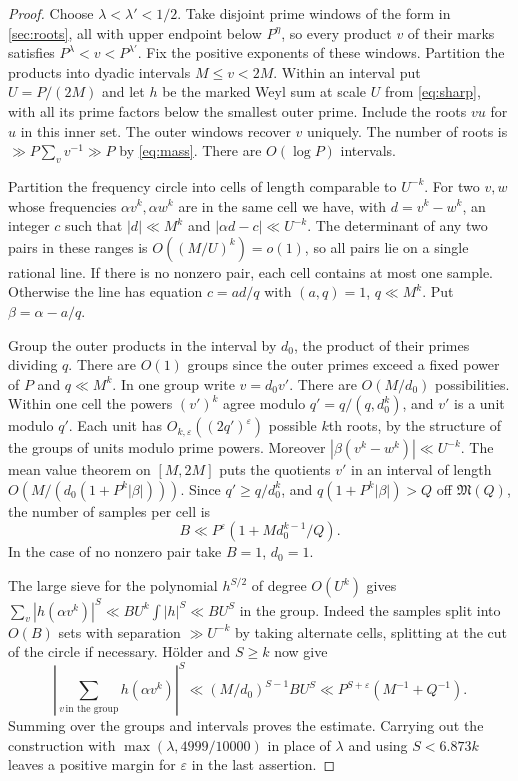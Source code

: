 \documentclass[11pt,letterpaper]{article}
\theoremstyle{definition}
\newcommand{\M}{\mathfrak M}
\newcommand{\eps}{\varepsilon}
\begin{document}
\begin{proof}
Choose $\lambda<\lambda'<1/2$. Take disjoint prime windows
of the form in \cref{sec:roots}, all with upper endpoint below $P^\eta$,
so every product $v$ of their marks satisfies $P^\lambda<v<P^{\lambda'}$.
Fix the positive exponents of these windows. Partition the products
into dyadic intervals $M\le v<2M$. Within an interval put $U=P/(2M)$
and let $h$ be the marked Weyl sum at scale $U$ from \eqref{eq:sharp},
with all its prime factors below the smallest outer prime. Include the
roots $vu$ for $u$ in this inner set. The outer windows recover $v$
uniquely. The number of roots is $\gg P\sum_v v^{-1}\gg P$ by
\eqref{eq:mass}. There are $O(\log P)$ intervals.

Partition the frequency circle into cells of length comparable to
$U^{-k}$. For two $v,w$ whose frequencies $\alpha v^k,\alpha w^k$
are in the same cell we have, with $d=v^k-w^k$, an integer $c$ such
that $|d|\ll M^k$ and $|\alpha d-c|\ll U^{-k}$. The determinant of any
two pairs in these ranges is $O((M/U)^k)=o(1)$, so all pairs lie on a
single rational line. If there is no nonzero pair, each cell contains
at most one sample. Otherwise the line has equation $c=ad/q$ with
$(a,q)=1$, $q\ll M^k$. Put $\beta=\alpha-a/q$.

Group the outer products in the interval by $d_0$, the product of their
primes dividing $q$. There are $O(1)$ groups since the outer primes
exceed a fixed power of $P$ and $q\ll M^k$. In one group write $v=d_0v'$.
There are $O(M/d_0)$ possibilities. Within one cell the powers $(v')^k$
agree modulo $q'=q/(q,d_0^k)$, and $v'$ is a unit modulo $q'$.
Each unit has $O_{k,\eps}((2q')^\eps)$ possible $k$th roots, by the
structure of the groups of units modulo prime powers. Moreover
$|\beta(v^k-w^k)|\ll U^{-k}$. The mean value theorem on $[M,2M]$ puts
the quotients $v'$ in an interval of length
$O(M/(d_0(1+P^k|\beta|)))$. Since $q'\ge q/d_0^k$, and
$q(1+P^k|\beta|)>Q$ off $\M(Q)$, the number of samples per cell is
\[
 B\ll P^\eps(1+M d_0^{k-1}/Q).
\]
In the case of no nonzero pair take $B=1$, $d_0=1$.

The large sieve for the polynomial $h^{S/2}$ of degree $O(U^k)$ gives
$\sum_v|h(\alpha v^k)|^S\ll B U^k\int |h|^S\ll B U^S$ in the group.
Indeed the samples split into $O(B)$ sets with separation $\gg U^{-k}$
by taking alternate cells, splitting at the cut of the circle if necessary.
H\"older and $S\ge k$ now give
\[
 \left|\sum_{v\,\text{in the group}}h(\alpha v^k)\right|^S
 \ll (M/d_0)^{S-1} B U^S
 \ll P^{S+\eps}(M^{-1}+Q^{-1}).
\]
Summing over the groups and intervals proves the estimate.
Carrying out the construction with $\max(\lambda,4999/10000)$ in place of $\lambda$ and using $S<6.873k$ leaves a positive
margin for $\eps$ in the last assertion.
\end{proof}
\end{document}
